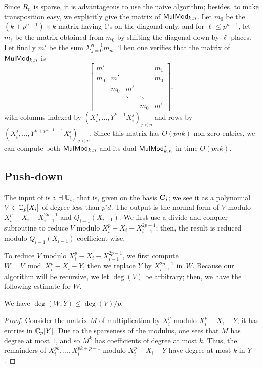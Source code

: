 Since $R_n$ is sparse, it is advantageous to use the naive algorithm;
besides, to make transposition easy, we explicitly give the matrix of
${\sf MulMod}_{k,n}$. Let $m_0$ be the $(k+p^{n-1})\times k$ matrix
having $1$'s on the diagonal only, and for $\ell \le p^{n-1}$, let
$m_\ell$ be the matrix obtained from $m_0$ by shifting the diagonal
down by $\ell$ places. Let finally $m'$ be the sum $\Sigma_{j=0}^{n-1}
m_{p^j}$. Then one verifies that the matrix of ${\sf MulMod}_{k,n}$
is $$\left [
\begin{matrix}
m'  &     &        &        & m_1 \\
m_0 & m'  &        &        & m_0 \\
    & m_0 & m'     &        &     \\
    &     & \ddots & \ddots &     \\
    &     &        & m_0    & m'
\end{matrix}
\right ],$$ with columns indexed by 
$(X_i^j,\dots,Y^{k-1}X_i^j)_{j < p}$ and rows by
$(X_i^j,\dots,Y^{k+p^{n-1}-1}X_i^j)_{j < p}$.  Since this matrix
has $O(pnk)$ non-zero entries,  we can compute both 
${\sf MulMod}_{k,n}$ and its dual ${\sf MulMod}_{k,n}^\ast$ in time $O(pnk)$.



\subsection{Push-down}\label{sec:level-embedding:push-down}

The input of  is $v \dashv \mathbb{U}_i$, that is, given on the
basis $\mathbf{C}_i$; we see it as a polynomial $V \in \mathbb{C}_p[X_i]$ of degree
less than $p^id$. The output is the normal form of $V$ modulo
$X_i^p-X_i-X_{i-1}^{2p-1}$ and $Q_{i-1}(X_{i-1})$. We first use a
divide-and-conquer subroutine to reduce $V$ modulo
$X_i^p-X_i-X_{i-1}^{2p-1}$; then, the result is reduced modulo
$Q_{i-1}(X_{i-1})$ coefficient-wise.

\smallskip

To reduce $V$ modulo $X_i^p-X_i-X_{i-1}^{2p-1}$, we first compute $W=V \bmod
X_i^p-X_i-Y$, then we replace $Y$ by $X_{i-1}^{2p-1}$ in~$W$.  Because our
algorithm will be recursive, we let $\deg(V)$ be arbitrary; then, we
have the following estimate for $W$.

\begin{lemma}
  \label{th:push-down-degree} We have $\deg(W,Y)\le \deg(V)/p$.
\end{lemma}
\begin{proof} Consider the matrix $M$ of multiplication by $X_i^p$ modulo
$X_i^p-X_i-Y$; it has entries in $\mathbb{C}_p[Y]$. Due to the
sparseness of the modulus, one sees that $M$ has degree at most $1$,
and so $M^k$ has coefficients of degree at most $k$. Thus, the
remainders of $X_i^{pk},\dots,X_i^{pk+p-1}$ modulo $X_i^p-X_i-Y$
have degree at most $k$ in $Y$. \end{proof}

